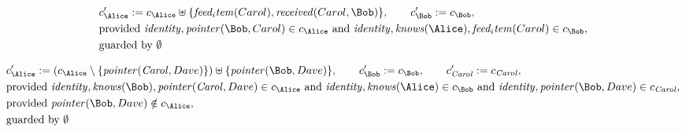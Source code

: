\begin{align*}
&
c'_
{
\Alice
}
 := 
c_
{
\Alice
}
 \uplus 
\{
\mathit{
feed_item
}
(
Carol
)
,
\mathit{
received
}
(
Carol
,
\Bob
)
\}
, \qquad 
c'_
{
\Bob
}
 := 
c_
{
\Bob
}
,\\
&
\text{provided } 
\mathit{
identity
}
,
\mathit{
pointer
}
(
\Bob
,
Carol
)
 \in c_
{
\Alice
}
 \text{ and } 
\mathit{
identity
}
,
\mathit{
knows
}
(
\Alice
)
,
\mathit{
feed_item
}
(
Carol
)
 \in c_
{
\Bob
}
,\\
&
\text{guarded by } \emptyset
\end{align*}

\begin{align*}
&
c'_
{
\Alice
}
 := 
(c_
{
\Alice
}
 \setminus 
\{
\mathit{
pointer
}
(
\mathit{Carol}
,
Dave
)
\}
) \uplus 
\{
\mathit{
pointer
}
(
\Bob
,
Dave
)
\}
, \qquad 
c'_
{
\Bob
}
 := 
c_
{
\Bob
}
, \qquad 
c'_
{
\mathit{Carol}
}
 := 
c_
{
\mathit{Carol}
}
,\\
&
\text{provided } 
\mathit{
identity
}
,
\mathit{
knows
}
(
\Bob
)
,
\mathit{
pointer
}
(
\mathit{Carol}
,
Dave
)
 \in c_
{
\Alice
}
 \text{ and } 
\mathit{
identity
}
,
\mathit{
knows
}
(
\Alice
)
 \in c_
{
\Bob
}
 \text{ and } 
\mathit{
identity
}
,
\mathit{
pointer
}
(
\Bob
,
Dave
)
 \in c_
{
\mathit{Carol}
}
,\\
&
\text{provided } 
\mathit{
pointer
}
(
\Bob
,
Dave
)
 \notin c_
{
\Alice
}
,\\
&
\text{guarded by } \emptyset
\end{align*}
